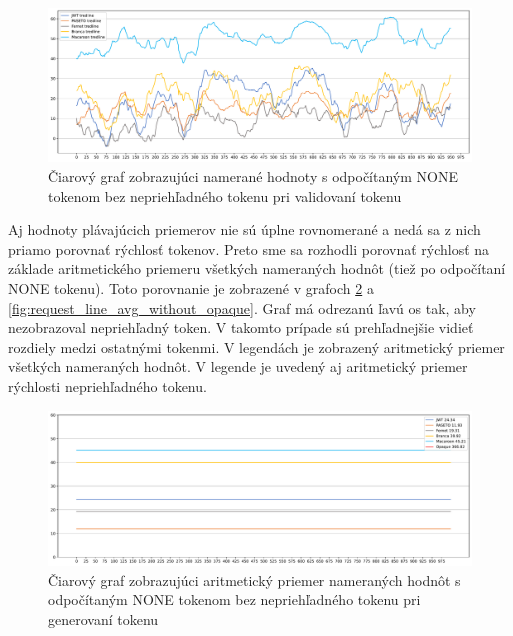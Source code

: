 \begin{figure}
  \centerline{\includegraphics[width=1\textwidth]{images/request_line_minus_none_without_opaque}}
  \caption[Čiarový graf -- validácia, odpočítaný NONE token]{Čiarový graf zobrazujúci namerané hodnoty s odpočítaným NONE tokenom bez nepriehľadného tokenu pri validovaní tokenu}
  \label{fig:request_line_minus_none_without_opaque}
\end{figure}

Aj hodnoty plávajúcich priemerov nie sú úplne rovnomerané a nedá sa z nich priamo porovnať rýchlosť tokenov. Preto sme sa rozhodli porovnať rýchlosť na základe aritmetického priemeru všetkých nameraných hodnôt (tiež po odpočítaní NONE tokenu). Toto porovnanie je zobrazené v grafoch \ref{fig:signin_line_avg_without_opaque} a \ref{fig:request_line_avg_without_opaque}. Graf má odrezanú ľavú os tak, aby nezobrazoval nepriehľadný token. V takomto prípade sú prehľadnejšie vidieť rozdiely medzi ostatnými tokenmi. V legendách je zobrazený aritmetický priemer všetkých nameraných hodnôt. V legende je uvedený aj aritmetický priemer rýchlosti nepriehľadného tokenu.

\begin{figure}
  \centerline{\includegraphics[width=1\textwidth]{images/signin_line_avg_without_opaque}}
  \caption[Čiarový graf -- generovanie, konštantný priemer]{Čiarový graf zobrazujúci aritmetický priemer nameraných hodnôt s odpočítaným NONE tokenom bez nepriehľadného tokenu pri generovaní tokenu}
  \label{fig:signin_line_avg_without_opaque}
\end{figure}

